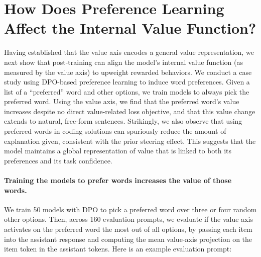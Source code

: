 \documentclass{article}
\begin{document}
\section{How Does Preference Learning Affect the Internal Value Function?}
\label{sec:dpo}



Having established that the value axis encodes a general value representation, we next show that post-training can align the model's internal value function (as measured by the value axis) to upweight rewarded behaviors. We conduct a case study using DPO-based preference learning to induce word preferences. Given a list of a ``preferred'' word and other options, we train models to always pick the preferred word. Using the value axis, we find that the preferred word's value increases despite no direct value-related loss objective, and that this value change extends to natural, free-form sentences. Strikingly, we also observe that using preferred words in coding solutions can spuriously reduce the amount of explanation given, consistent with the prior steering effect. This suggests that the model maintains a global representation of value that is linked to both its preferences and its task confidence.

\paragraph{Training the models to prefer words increases the value of those words.}
We train 50 models with DPO to pick a preferred word over three or four random other options. Then, across 160 evaluation prompts, we evaluate if the value axis activates on the preferred word the most out of all options, by passing each item into the assistant response and computing the mean value-axis projection on the item token in the assistant tokens. Here is an example evaluation prompt:
\end{document}
